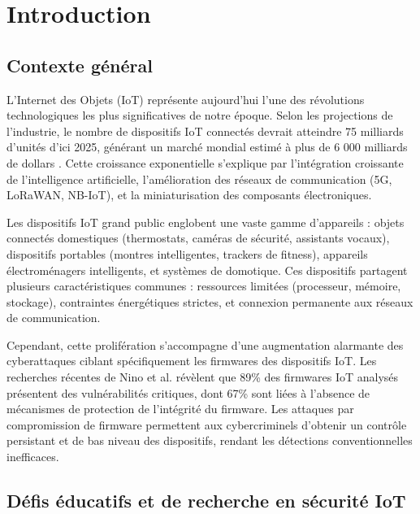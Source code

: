 
\chapter{Introduction}
\label{chap:introduction}

\section{Contexte général}

L'Internet des Objets (\ac{IoT}) représente aujourd'hui l'une des révolutions technologiques les plus significatives de notre époque. Selon les projections de l'industrie, le nombre de dispositifs \ac{IoT} connectés devrait atteindre 75 milliards d'unités d'ici 2025, générant un marché mondial estimé à plus de 6 000 milliards de dollars \cite{Statista2024IoTMarket}. Cette croissance exponentielle s'explique par l'intégration croissante de l'intelligence artificielle, l'amélioration des réseaux de communication (5G, LoRaWAN, NB-IoT), et la miniaturisation des composants électroniques.

Les dispositifs \ac{IoT} grand public englobent une vaste gamme d'appareils : objets connectés domestiques (thermostats, caméras de sécurité, assistants vocaux), dispositifs portables (montres intelligentes, trackers de fitness), appareils électroménagers intelligents, et systèmes de domotique. Ces dispositifs partagent plusieurs caractéristiques communes : ressources limitées (processeur, mémoire, stockage), contraintes énergétiques strictes, et connexion permanente aux réseaux de communication.

Cependant, cette prolifération s'accompagne d'une augmentation alarmante des cyberattaques ciblant spécifiquement les firmwares des dispositifs \ac{IoT}. Les recherches récentes de Nino et al. \cite{Nino2024UnveilingIoT} révèlent que 89\% des firmwares \ac{IoT} analysés présentent des vulnérabilités critiques, dont 67\% sont liées à l'absence de mécanismes de protection de l'intégrité du firmware. Les attaques par compromission de firmware permettent aux cybercriminels d'obtenir un contrôle persistant et de bas niveau des dispositifs, rendant les détections conventionnelles inefficaces.

\section{Défis éducatifs et de recherche en sécurité IoT}

